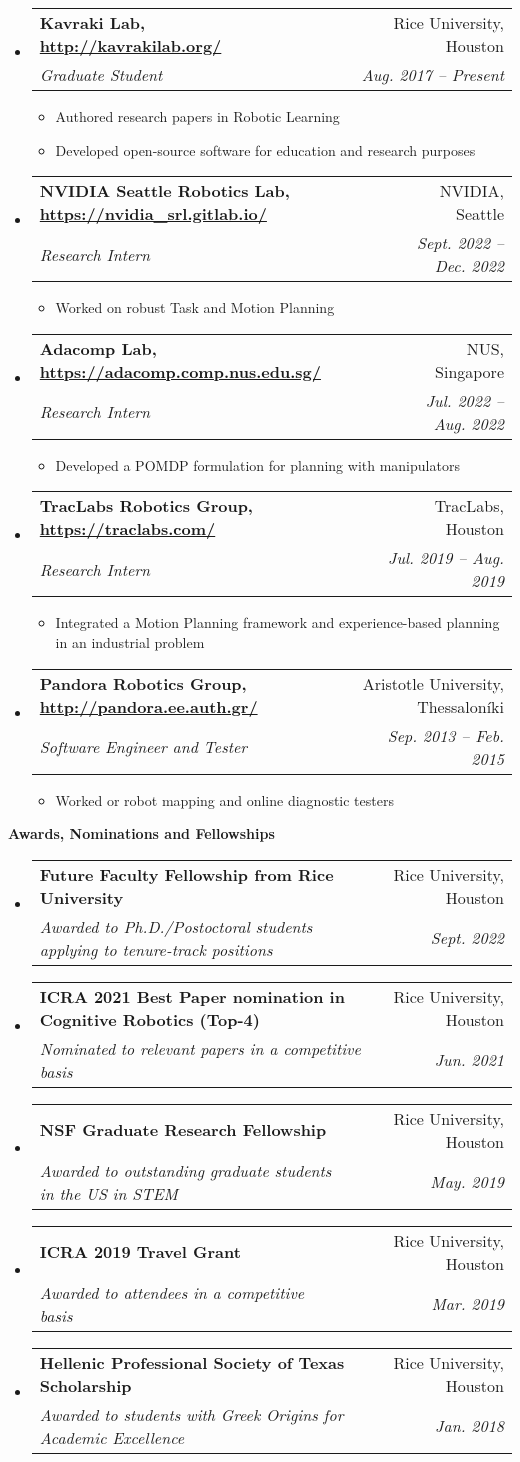 \documentclass[letterpaper,11pt]{article}
\makeatletter
\newcommand{\resitem}[1]{\item #1 \vspace{-2pt}}
\newcommand{\resheading}[1]{{\large \colorbox{mygrey}{\begin{minipage}{\textwidth}{\textbf{#1 \vphantom{p\^{E}}}}\end{minipage}}}}
\newcommand{\ressubheading}[4]{
\begin{tabular*}{7.0in}{l@{\extracolsep{\fill}}r}
		\textbf{#1} & #2 \\
		\textit{#3} & \textit{#4} \\
\end{tabular*}\vspace{-6pt}}
\makeatother
\begin{document}
\begin{itemize}
	
    \item
        \ressubheading{Kavraki Lab, \url{http://kavrakilab.org/}}
	{Rice University, Houston}{Graduate Student}
	{Aug. 2017 -- Present  }
	\begin{itemize}
		\resitem{Authored research papers in Robotic Learning}
		\resitem{Developed open-source software for education and research purposes}
	\end{itemize}
\item
\ressubheading{NVIDIA Seattle Robotics Lab, \url{https://nvidia_srl.gitlab.io/}}
{NVIDIA, Seattle}{Research Intern}
{Sept. 2022 -- Dec. 2022}
   \begin{itemize}
   \resitem{Worked on robust Task and Motion Planning}
   \end{itemize}
\item
\ressubheading{Adacomp Lab, \url{https://adacomp.comp.nus.edu.sg/}}
{NUS, Singapore}{Research Intern}
{Jul. 2022 -- Aug. 2022}
    \begin{itemize}
	\resitem{Developed a POMDP formulation for planning with manipulators} 
    \end{itemize}
\item
    \ressubheading{TracLabs Robotics Group, \url{https://traclabs.com/}}
    {TracLabs, Houston}{Research Intern}
    {Jul. 2019 -- Aug. 2019}
    \begin{itemize}
    	\resitem{Integrated a Motion Planning framework and experience-based planning in an industrial problem}
    \end{itemize}
\item
     \ressubheading{Pandora Robotics Group, \url{http://pandora.ee.auth.gr/}}
	{Aristotle University, Thessaloníki}{Software Engineer and Tester}
	{Sep. 2013 -- Feb. 2015}
	\begin{itemize}
		\resitem{Worked or robot mapping and online diagnostic testers} 
	\end{itemize}
\end{itemize}
\resheading{Awards, Nominations and Fellowships}
\begin{itemize}
	\item
	\ressubheading{Future Faculty Fellowship from Rice University}
	{Rice University, Houston}{Awarded to  Ph.D./Postoctoral students applying to tenure-track positions }
	{Sept. 2022}
	\item
	\ressubheading{ICRA 2021 Best Paper nomination in Cognitive Robotics (Top-4)}
	{Rice University, Houston}{Nominated to relevant papers in a competitive basis}
	{Jun. 2021}
	\item
	\ressubheading{NSF Graduate Research Fellowship}
	{Rice University, Houston}{Awarded to outstanding graduate students in the US in STEM }{May. 2019}
	\item
	\ressubheading{ICRA 2019 Travel Grant}
	{Rice University, Houston}{Awarded to attendees in a competitive basis}{Mar. 2019}
	\item
	\ressubheading{Hellenic Professional Society of Texas Scholarship}
	{Rice University, Houston}{Awarded to students with Greek Origins for Academic Excellence}
	{Jan. 2018}
\end{itemize}
\end{document}
